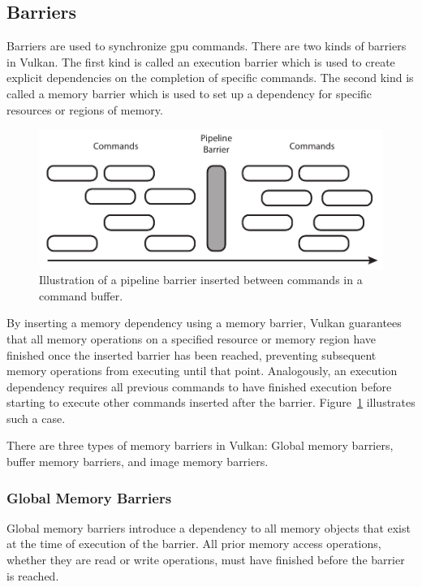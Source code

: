     \subsection{Barriers}
    \label{sub:Barriers}
      \proofread
      Barriers are used to synchronize \gls{gpu} commands.
      There are two kinds of barriers in Vulkan.
      The first kind is called an execution barrier which is used to create explicit dependencies on the completion of specific commands.
      The second kind is called a memory barrier which is used to set up a dependency for specific resources or regions of memory.

      \begin{figure}
        \centering
        \includegraphics[width=\textwidth]{Main/Images/PipelineBarrier}
        \caption{Illustration of a pipeline barrier inserted between commands in a command buffer.}
        \label{fig:PipelineBarrier}
      \end{figure}

      \proofread
      By inserting a memory dependency using a memory barrier, Vulkan guarantees that all memory operations on a specified resource or memory region have finished once the inserted barrier has been reached, preventing subsequent memory operations from executing until that point.
      Analogously, an execution dependency requires all previous commands to have finished execution before starting to execute other commands inserted after the barrier.
      \proofread
      Figure~\ref{fig:PipelineBarrier} illustrates such a case.

      There are three types of memory barriers in Vulkan: Global memory barriers, buffer memory barriers, and image memory barriers.

      \subsubsection{Global Memory Barriers}
        Global memory barriers introduce a dependency to all memory objects that exist at the time of execution of the barrier.
        All prior memory access operations, whether they are read or write operations, must have finished before the barrier is reached.

